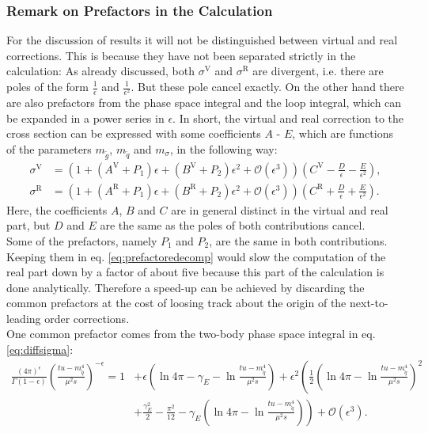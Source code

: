 \subsubsection{Remark on Prefactors in the Calculation}\label{sec:prefactors}
For the discussion of results it will not be distinguished between virtual and real corrections. This is because they have not been separated strictly in the calculation: As already discussed, both $\sigma^{\mathrm{V}}$ and $\sigma^{\mathrm{R}}$ are divergent, i.e. there are poles of the form $\frac{1}{\epsilon}$ and $\frac{1}{\epsilon^2}$. But these pole cancel exactly. On the other hand there are also prefactors from the phase space integral and the loop integral, which can be expanded in a power series in $\epsilon$. In short, the virtual and real correction to the cross section can be expressed with some coefficients $A$ - $E$, which are functions of the parameters $m_{\tilde{g}}$, $m_{\tilde{q}}$ and $m_{\sigma}$, in the following way:
\begin{align}
\sigma^{\mathrm{V}} &= \left( 1 + (A^{\mathrm{V}} + P_1)\epsilon + (B^{\mathrm{V}} + P_2)\epsilon^2 + \mathcal{O}(\epsilon^3) \right)\left( C^{\mathrm{V}} - \frac{D}{\epsilon} - \frac{E}{\epsilon^2} \right),\\
\sigma^{\mathrm{R}} &= \left( 1 + (A^{\mathrm{R}} + P_1)\epsilon + (B^{\mathrm{R}} + P_2)\epsilon^2 + \mathcal{O}(\epsilon^3) \right)\left( C^{\mathrm{R}} + \frac{D}{\epsilon} + \frac{E}{\epsilon^2} \right).\label{eq:prefactoredecomp}
\end{align}
Here, the coefficients $A$, $B$ and $C$ are in general distinct in the virtual and real part, but $D$ and $E$ are the same as the poles of both contributions cancel.\\
Some of the prefactors, namely $P_1$ and $P_2$, are the same in both contributions. Keeping them in eq. \eqref{eq:prefactoredecomp} would slow the computation of the real part down by a factor of about five because this part of the calculation is done analytically. Therefore a speed-up can be achieved by discarding the common prefactors at the cost of loosing track about the origin of the next-to-leading order corrections.\\
One common prefactor comes from the two-body phase space integral in eq. \eqref{eq:diffsigma}:
\begin{align}
\frac{(4\pi)^\epsilon}{\Gamma(1-\epsilon)}\left( \frac{tu - m_{\tilde{q}}^4}{\mu^2 s} \right)^{-\epsilon} = 1 &+ \epsilon\left( \ln 4\pi -\gamma_E - \ln \frac{tu - m_{\tilde{q}}^4}{\mu^2 s} \right)  
+ \epsilon^2\left( \frac{1}{2}\left( \ln 4\pi - \ln \frac{tu - m_{\tilde{q}}^4}{\mu^2 s} \right)^2 \right.\nonumber\\
&+ \left.\frac{\gamma_E^2}{2} - \frac{\pi^2}{12} - \gamma_E\left( \ln 4\pi - \ln \frac{tu - m_{\tilde{q}}^4}{\mu^2 s} \right) \right) + \mathcal{O}(\epsilon^3).\label{eq:PhasePrefactor}
\end{align}
